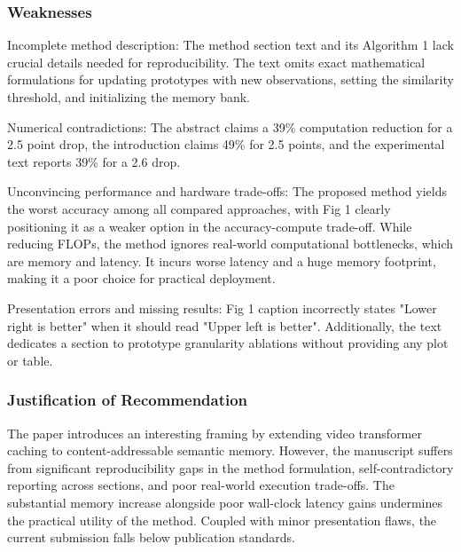 \documentclass[11pt]{article}
\begin{document}
\subsubsection*{Weaknesses}
Incomplete method description: The method section text and its Algorithm 1 lack crucial details needed for reproducibility. The text omits exact mathematical formulations for updating prototypes with new observations, setting the similarity threshold, and initializing the memory bank.

Numerical contradictions: The abstract claims a 39\% computation reduction for a 2.5 point drop, the introduction claims 49\% for 2.5 points, and the experimental text reports 39\% for a 2.6 drop.

Unconvincing performance and hardware trade-offs: The proposed method yields the worst accuracy among all compared approaches, with Fig 1 clearly positioning it as a weaker option in the accuracy-compute trade-off. While reducing FLOPs, the method ignores real-world computational bottlenecks, which are memory and latency. It incurs worse latency and a huge memory footprint, making it a poor choice for practical deployment.

Presentation errors and missing results: Fig 1 caption incorrectly states "Lower right is better" when it should read "Upper left is better". Additionally, the text dedicates a section to prototype granularity ablations without providing any plot or table.

\subsubsection*{Justification of Recommendation}
The paper introduces an interesting framing by extending video transformer caching to content-addressable semantic memory. However, the manuscript suffers from significant reproducibility gaps in the method formulation, self-contradictory reporting across sections, and poor real-world execution trade-offs. The substantial memory increase alongside poor wall-clock latency gains undermines the practical utility of the method. Coupled with minor presentation flaws, the current submission falls below publication standards.
\end{document}
